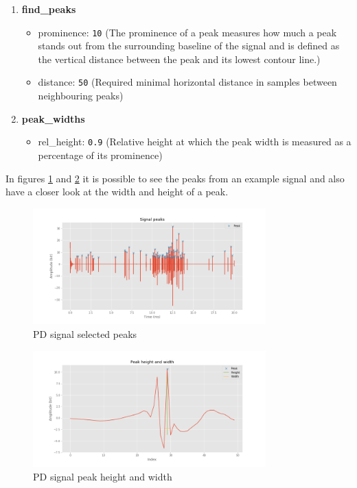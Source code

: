 \documentclass[11pt]{article}
\providecommand{\tightlist}{%
      \setlength{\itemsep}{0pt}\setlength{\parskip}{0pt}}
\begin{document}
\begin{enumerate}
\def\labelenumi{\arabic{enumi}.}
\tightlist
\item
  \textbf{find\_peaks}

  \begin{itemize}
  \item
    prominence: \texttt{10} (The prominence of a peak measures how much
    a peak stands out from the surrounding baseline of the signal and is
    defined as the vertical distance between the peak and its lowest
    contour line.)
  \item
    distance: \texttt{50} (Required minimal horizontal distance in
    samples between neighbouring peaks)
  \end{itemize}
\item
  \textbf{peak\_widths}

  \begin{itemize}
  \tightlist
  \item
    rel\_height: \texttt{0.9} (Relative height at which the peak width
    is measured as a percentage of its prominence)
  \end{itemize}
\end{enumerate}

In figures \ref{fig:pdsignal_peaks} and \ref{fig:pdsignal_peaks_width}  it is possible to see the peaks from an example signal and also have a closer look at the width and height of a peak.

\begin{figure}[h]
\centering
\includegraphics[width=0.8\textwidth]{signal_peaks.png}
\caption{PD signal selected peaks}
\label{fig:pdsignal_peaks}
\end{figure}

\begin{figure}[h]
\centering
\includegraphics[width=0.8\textwidth]{signal_peak_zoom.png}
\caption{PD signal peak height and width}
\label{fig:pdsignal_peaks_width}
\end{figure}
\end{document}
